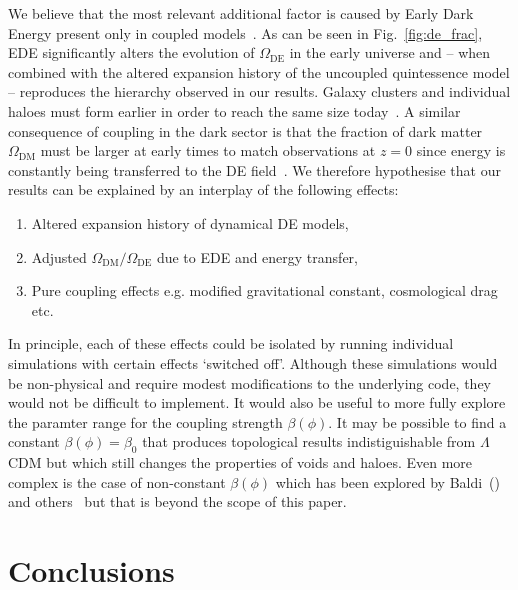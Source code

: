 \documentclass[a4paper,fleqn,usenatbib]{mnras}
\begin{document}
We believe that the most relevant additional factor is caused by Early Dark Energy present only in coupled models~\citep{2000PhRvD..62d3511A}. As can be seen in Fig.~\ref{fig:de_frac}, EDE significantly alters the evolution of $\Omega_{\mathrm{DE}}$ in the early universe and -- when combined with the altered expansion history of the uncoupled quintessence model -- reproduces the hierarchy observed in our results. Galaxy clusters and individual haloes must form earlier in order to reach the same size today~\citep{2006A&A...454...27B}. A similar consequence of coupling in the dark sector is that the fraction of dark matter $\Omega_{\mathrm{DM}}$ must be larger at early times to match observations at $z=0$ since energy is constantly being transferred to the DE field~\citep{2009PhRvD..80j3514X}. We therefore hypothesise that our results can be explained by an interplay of the following effects:
\renewcommand\labelenumi{\roman{enumi}.}
\renewcommand\theenumi\labelenumi
\begin{enumerate}
\item Altered expansion history of dynamical DE models,
\item Adjusted $\Omega_{\mathrm{DM}} / \Omega_{\mathrm{DE}}$ due to EDE and energy transfer,
\item Pure coupling effects e.g. modified gravitational constant, cosmological drag etc.
\end{enumerate}

In principle, each of these effects could be isolated by running individual simulations with certain effects `switched off'. Although these simulations would be non-physical and require modest modifications to the underlying code, they would not be difficult to implement. It would also be useful to more fully explore the paramter range for the coupling strength $\beta(\phi)$. It may be possible to find a constant $\beta(\phi)=\beta_0$ that produces topological results indistiguishable from $\Lambda$CDM but which still changes the properties of voids and haloes. Even more complex is the case of non-constant $\beta(\phi)$ which has been explored by Baldi~(\citeyear{2011MNRAS.411.1077B}) and others~\citep{2011EPJC...71.1700L} but that is beyond the scope of this paper.



\section{Conclusions}
\label{sec:conclusion}
\end{document}
